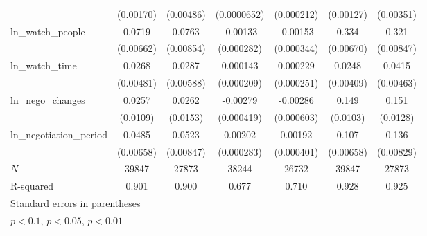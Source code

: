 {\begin{tabular}{l*{6}{c}}
            &   (0.00170)         &   (0.00486)         & (0.0000652)         &  (0.000212)         &   (0.00127)         &   (0.00351)         \\
\addlinespace
ln\_watch\_people&      0.0719\sym{***}&      0.0763\sym{***}&    -0.00133\sym{***}&    -0.00153\sym{***}&       0.334\sym{***}&       0.321\sym{***}\\
            &   (0.00662)         &   (0.00854)         &  (0.000282)         &  (0.000344)         &   (0.00670)         &   (0.00847)         \\
\addlinespace
ln\_watch\_time&      0.0268\sym{***}&      0.0287\sym{***}&    0.000143         &    0.000229         &      0.0248\sym{***}&      0.0415\sym{***}\\
            &   (0.00481)         &   (0.00588)         &  (0.000209)         &  (0.000251)         &   (0.00409)         &   (0.00463)         \\
\addlinespace
ln\_nego\_changes&      0.0257\sym{**} &      0.0262\sym{*}  &    -0.00279\sym{***}&    -0.00286\sym{***}&       0.149\sym{***}&       0.151\sym{***}\\
            &    (0.0109)         &    (0.0153)         &  (0.000419)         &  (0.000603)         &    (0.0103)         &    (0.0128)         \\
\addlinespace
ln\_negotiation\_period&      0.0485\sym{***}&      0.0523\sym{***}&     0.00202\sym{***}&     0.00192\sym{***}&       0.107\sym{***}&       0.136\sym{***}\\
            &   (0.00658)         &   (0.00847)         &  (0.000283)         &  (0.000401)         &   (0.00658)         &   (0.00829)         \\
\midrule
\(N\)       &       39847         &       27873         &       38244         &       26732         &       39847         &       27873         \\
R-squared   &       0.901         &       0.900         &       0.677         &       0.710         &       0.928         &       0.925         \\
\bottomrule
\multicolumn{7}{l}{\footnotesize Standard errors in parentheses}\\
\multicolumn{7}{l}{\footnotesize \sym{*} \(p<0.1\), \sym{**} \(p<0.05\), \sym{***} \(p<0.01\)}\\
\end{tabular}
}
